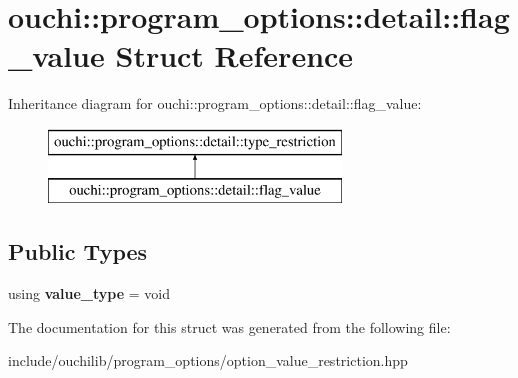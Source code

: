 \hypertarget{structouchi_1_1program__options_1_1detail_1_1flag__value}{}\section{ouchi\+::program\+\_\+options\+::detail\+::flag\+\_\+value Struct Reference}
\label{structouchi_1_1program__options_1_1detail_1_1flag__value}
Inheritance diagram for ouchi\+::program\+\_\+options\+::detail\+::flag\+\_\+value\+:\begin{figure}[H]
\begin{center}
\leavevmode
\includegraphics[height=2.000000cm]{structouchi_1_1program__options_1_1detail_1_1flag__value}
\end{center}
\end{figure}
\subsection*{Public Types}
\begin{DoxyCompactItemize}
\item 
\mbox{\label{structouchi_1_1program__options_1_1detail_1_1flag__value_ab1cac10556e801266aebb3d82708ceff}} 
using {\bfseries value\+\_\+type} = void
\end{DoxyCompactItemize}


The documentation for this struct was generated from the following file\+:\begin{DoxyCompactItemize}
\item 
include/ouchilib/program\+\_\+options/option\+\_\+value\+\_\+restriction.\+hpp\end{DoxyCompactItemize}
